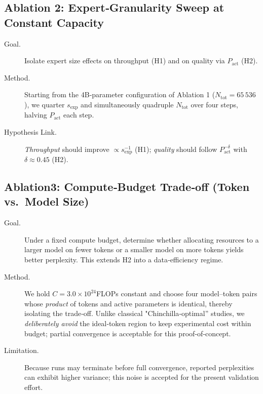\documentclass[11pt]{article}
\begin{document}
\subsection{Ablation 2: Expert‑Granularity Sweep at Constant Capacity}
\begin{description}
  \item[Goal.]  Isolate expert size effects on throughput (H1) and on
        quality via $P_{\mathrm{act}}$ (H2).
  \item[Method.]  
        Starting from the 4B‑parameter configuration of Ablation 1
        ($N_{\mathrm{tot}} = 65\,536$), we
        quarter $s_{\mathrm{exp}}$ and simultaneously quadruple
        $N_{\mathrm{tot}}$ over four steps, halving
        $P_{\mathrm{act}}$ each step.
  \item[Hypothesis Link.]
        \emph{Throughput} should improve $\propto s_{\mathrm{exp}}^{-1}$
        (H1); \emph{quality} should follow
        $P_{\mathrm{act}}^{-\delta}$ with $\delta \approx 0.45$ (H2).
\end{description}

\subsection{Ablation3: Compute‑Budget Trade‑off (Token vs.\ Model Size)}
\begin{description}
  \item[Goal.]  Under a fixed compute budget, determine whether allocating
        resources to a larger model on fewer tokens or a smaller model on
        more tokens yields better perplexity.  This extends H2 into a
        data‑efficiency regime.
  \item[Method.]  
        We hold $C = 3.0 \times 10^{24}$FLOPs constant and choose four
        model–token pairs whose \emph{product} of tokens and active
        parameters is identical, thereby isolating the trade‑off.  
        Unlike classical "Chinchilla‑optimal'' studies, we \emph{deliberately
        avoid} the ideal‑token region to keep experimental cost within
        budget; partial convergence is acceptable for this proof‑of‑concept.
  \item[Limitation.]  
        Because runs may terminate before full convergence, reported
        perplexities can exhibit higher variance; this noise is accepted
        for the present validation effort.
\end{description}
\end{document}
